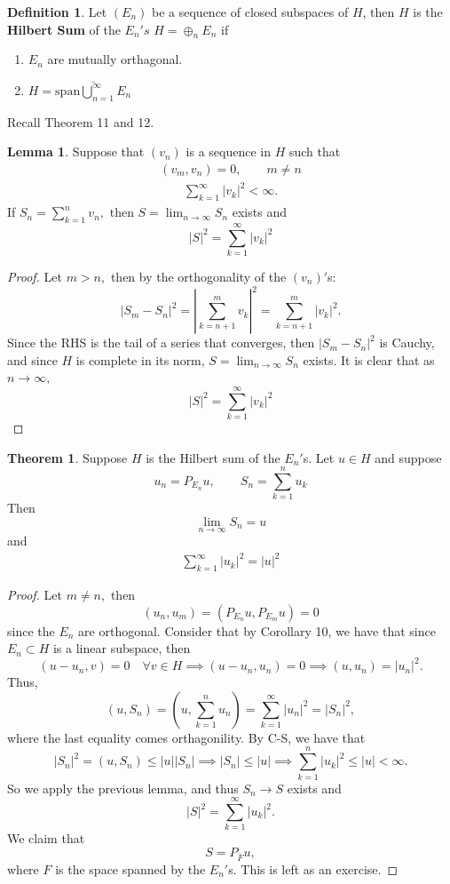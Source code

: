 \documentclass[10pt, oneside]{article}
\theoremstyle{definition}
\newtheorem{thm}{Theorem}
\newtheorem{defn}{Definition}
\newtheorem{lem}{Lemma}
\begin{document}
\begin{defn}
    Let $(E_n)$ be a sequence of closed subspaces of $H$, then $H$ is the \textbf{Hilbert Sum} of the $E_n's$ $H = \oplus_{n} E_n$ if 
    \begin{enumerate}
        \item $E_n$ are mutually orthagonal.
        \item $H = \overline{\text{span}\bigcup_{n=1}^\infty E_n}$
    \end{enumerate}
\end{defn}
Recall Theorem 11 and 12.
\begin{lem}
    Suppose that $(v_n)$ is a sequence in $H$ such that 
    \begin{align}
        (v_m, v_n) = 0, \qquad m\neq n
    \end{align}
    \begin{align}
        \sum_{k=1}^\infty |v_k|^2 < \infty.
    \end{align}
    If $S_n = \sum_{k=1}^n v_n,$ then $S = \lim_{n \to \infty}S_n$ exists and 
    \[|S|^2 = \sum_{k=1}^\infty |v_k|^2\]
\end{lem}
\begin{proof}
    Let $m>n,$ then by the orthogonality of the $(v_n)'$s:
    \[|S_m - S_n|^2 = |\sum_{k= n+1}^m v_k|^2 = \sum_{k=n+1}^m|v_k|^2.\] Since the RHS is the tail of a series that converges, then $|S_m - S_n|^2$ is Cauchy, and since $H$ is complete in its norm, $S = \lim_{n\to \infty} S_n$ exists. It is clear that as $n\to \infty,$ 
    \[|S|^2 = \sum_{k=1}^\infty |v_k|^2\]
\end{proof}

\begin{thm}
    Suppose $H$ is the Hilbert sum of the $E_n'$s. Let $u\in H$ and suppose 
    \[u_n = P_{E_n}u, \qquad S_n = \sum_{k=1}^n u_k\] Then 
    \[\lim_{n\to \infty} S_n = u\] and 
    \begin{align}
        \sum_{k=1}^\infty |u_k|^2 = |u|^2
    \end{align}
\end{thm}
\begin{proof}
    Let $m\neq n,$ then 
    \[(u_n, u_m) = (P_{E_n}u, P_{E_m}u) = 0\] since the $E_n$ are orthogonal. Consider that by Corollary 10, we have that since $E_n \subset H$ is a linear subspace, then 
    \[(u-u_n, v) = 0 \quad \forall v\in H \implies (u - u_n, u_n) = 0 \implies (u,u_n) = |u_n|^2.\] Thus, 
    \[(u, S_n) = (u, \sum_{k=1}^n u_n) = \sum_{k=1}^\infty|u_n|^2 = |S_n|^2,\] where the last equality comes orthagonility. By C-S, we have that 
    \[|S_n|^2 = (u, S_n) \leq |u||S_n| \implies |S_n| \leq |u| \implies \sum_{k=1}^n |u_k|^2 \leq |u|< \infty.\] So we apply the previous lemma, and thus $S_n \to S$ exists and 
    \[|S|^2 = \sum_{k=1}^\infty |u_k|^2.\] We claim that 
    \[S = P_{\overline{F}}u,\] where $F$ is the space spanned by the $E_n'$s. This is left as an exercise. 
\end{proof}
\end{document}
